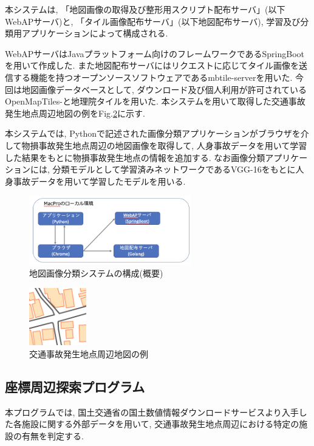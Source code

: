 \documentclass[a4j,8.5pt, twocolumn,fleqn]{jbook}
\begin{document}
本システムは, 「地図画像の取得及び整形用スクリプト配布サーバ」(以下WebAPサーバ)と, 「タイル画像配布サーバ」(以下地図配布サーバ), 学習及び分類用アプリケーションによって構成される. 

WebAPサーバはJavaプラットフォーム向けのフレームワークであるSpringBootを用いて作成した. また地図配布サーバにはリクエストに応じてタイル画像を送信する機能を持つオープンソースソフトウェアであるmbtile-server\cite{mbtile-server}を用いた. 
今回は地図画像データベースとして, ダウンロード及び個人利用が許可されているOpenMapTiles-\cite{openmaptiles}と地理院タイル\cite{tiriixn_tile}を用いた. 
本システムを用いて取得した交通事故発生地点周辺地図の例をFig.\ref{tiriixn}に示す. 

本システムでは, Pythonで記述された画像分類アプリケーションがブラウザを介して物損事故発生地点周辺の地図画像を取得して, 人身事故データを用いて学習した結果をもとに物損事故発生地点の情報を追加する. 
なお画像分類アプリケーションには, 分類モデルとして学習済みネットワークであるVGG-16をもとに人身事故データを用いて学習したモデルを用いる. 

\begin{figure}[htb]
    \centering
    \includegraphics[height=30mm]{images/mapclassification_server.png}
    \vspace{-3mm}
    \caption{地図画像分類システムの構成(概要)}
    \label{classifications}
\end{figure}

\begin{figure}[htb]
    \centering
    \includegraphics[height=25mm]{images/tiriixn.png}
    \vspace{-3mm}
    \caption{交通事故発生地点周辺地図の例}
    \label{tiriixn}
\end{figure}

\subsection{座標周辺探索プログラム}
本プログラムでは, 国土交通省の国土数値情報ダウンロードサービス\cite{国土数値情報ダウンロードサービス}より入手した各施設に関する外部データを用いて, 交通事故発生地点周辺における特定の施設の有無を判定する. 
\end{document}
